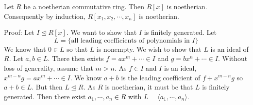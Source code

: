 \begin{thm}
Let $R$ be a noetherian commutative ring. Then $R[x]$ is noetherian. Consequently by induction, $R[x_1,x_2,\cdots,x_n]$ is noetherian. 
\end{thm}

Proof: Let $I \unlhd R[x]$. We want to show that $I$ is finitely generated. Let 
\[
L=\{\text{all leading coefficients of polynomials in }I\}
\]
 We know that $0 \in L$ so that $L$ is nonempty. We wish to show that $L$ is an ideal of $R$. Let $a,b \in L$. There then exists $f=ax^m+\cdots \in I$ and $g=bx^n+\cdots \in I$. Without loss of generality, assume that $m>n$. As $f \in I$ and $I$ is an ideal, $x^{m-n}g=ax^m+\cdots \in I$. We know $a+b$ is the leading coefficient of $f+x^{m-n}g$ so $a+b \in L$. But then $L \unlhd R$. As $R$ is noetherian, it must be that $L$ is finitely generated. Then there exist $a_1,\cdots,a_n \in R$ with $L=\langle a_1,\cdots,a_n\rangle$. 

